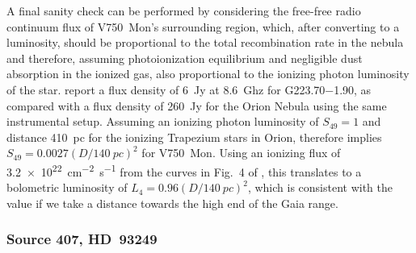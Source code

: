 A final sanity check can be performed by considering the free-free
radio continuum flux of V750~Mon's surrounding \hii{} region, which,
after converting to a luminosity, should be proportional to the total
recombination rate in the nebula and therefore, assuming
photoionization equilibrium and negligible dust absorption in the
ionized gas, also proportional to the ionizing photon luminosity of
the star.  \citet{Quireza:2006b} report a flux density of \SI{6}{Jy}
at \SI{8.6}{Ghz} for G\num{223.70}\num{-1.90}, as compared with a flux
density of \SI{260}{Jy} for the Orion Nebula using the same
instrumental setup.  Assuming an ionizing photon luminosity of
\(S_{49} = 1\) and distance \SI{410}{pc} for the ionizing Trapezium
stars in Orion, therefore implies
\(S_{49} = 0.0027 (D/\SI{140}{pc})^2\) for V750~Mon.  Using an
ionizing flux of \SI{3.2e22}{cm^{-2}.s^{-1}} from the curves in Fig.~4
of \citet{Sternberg:2003a}, this translates to a bolometric luminosity
of \(L_4 = 0.96 (D/\SI{140}{pc})^2\), which is consistent with the
\citet{Fairlamb:2015a} value if we take a distance towards the high
end of the Gaia range.

\subsubsection{Source 407, HD~93249}
\label{sec:source-407}



